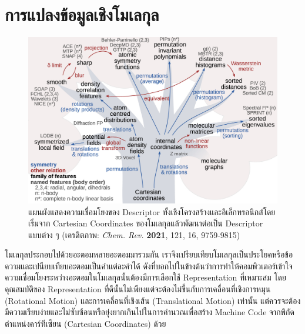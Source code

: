 \section{การแปลงข้อมูลเชิงโมเลกุล}
\label{sec:mol_transform}

\begin{figure}[H]
    \centering
    \includegraphics[width=\linewidth]{fig/qm_descriptors_map.jpeg}
    \caption{แผนผังแสดงความเชื่อมโยงของ Descriptor ทั้งเชิงโครงสร้างและอิเล็กทรอนิกส์โดยเริ่มจาก Cartesian Coordinates ของโมเลกุลแล้วพัฒนาต่อเป็น Descriptor แบบต่าง ๆ
        (เครดิตภาพ: \textit{Chem. Rev.} \textbf{2021}, 121, 16, 9759-9815\autocite{musil2021})}
    \label{fig:qm_descriptor_map}
\end{figure}

โมเลกุลประกอบไปด้วยอะตอมหลายอะตอมมารวมกัน เราจึงเปรียบเทียบโมเลกุลเป็นประโยคหรือข้อความและเปนียบเทียบอะตอมเป็นคำแต่ละคำได้ ดังที่บอกไปในข้างต้นว่าการทำให้คอมพิวเตอร์เข้าใจความเชื่อมโยงระหว่างอะตอมในโมเลกุลนั้นต้องมีการเลือกใช้ Representation ที่เหมาะสม โดยคุณสมบัติของ Representation ที่ดีนั้นไม่เพียงแต่จะต้องไม่ขึ้นกับการเคลื่อนที่เชิงการหมุน (Rotational Motion) และการเคลื่อนที่เชิงเส้น (Translational Motion) เท่านั้น แต่ควรจะต้องมีความเรียบง่ายและไม่ซับซ้อนหรือยุ่งยากเกินไปในการคำนวณเพื่อสร้าง Machine Code จากพิกัดตำแหน่งคาร์ทีเซียน (Cartesian Coordinates) ด้วย

